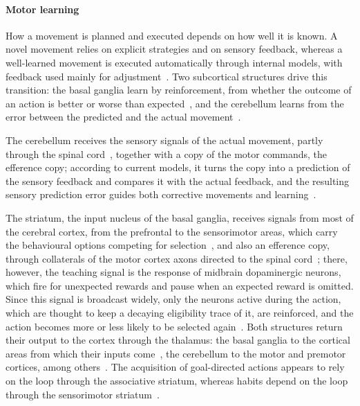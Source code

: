 \documentclass[12pt]{report}
\begin{document}
\paragraph{Motor learning}
How a movement is planned and executed depends on how well it is known. A novel movement relies on explicit strategies and on sensory feedback, whereas a well-learned movement is executed automatically through internal models, with feedback used mainly for adjustment~\cite[pp.~729--732]{wolpert2021}. Two subcortical structures drive this transition: the basal ganglia learn by reinforcement, from whether the outcome of an action is better or worse than expected~\cite[pp.~943--946]{redgrave2021}, and the cerebellum learns from the error between the predicted and the actual movement~\cite[pp.~923--925]{bastian2021}.

The cerebellum receives the sensory signals of the actual movement, partly through the spinal cord~\cite[pp.~916, 918]{bastian2021}, together with a copy of the motor commands, the efference copy; according to current models, it turns the copy into a prediction of the sensory feedback and compares it with the actual feedback, and the resulting sensory prediction error guides both corrective movements and learning~\cite[p.~923]{bastian2021}.

The striatum, the input nucleus of the basal ganglia, receives signals from most of the cerebral cortex, from the prefrontal to the sensorimotor areas, which carry the behavioural options competing for selection~\cite[pp.~934, 938--939]{redgrave2021}, and also an efference copy, through collaterals of the motor cortex axons directed to the spinal cord~\cite[p.~939]{redgrave2021}; there, however, the teaching signal is the response of midbrain dopaminergic neurons, which fire for unexpected rewards and pause when an expected reward is omitted. Since this signal is broadcast widely, only the neurons active during the action, which are thought to keep a decaying eligibility trace of it, are reinforced, and the action becomes more or less likely to be selected again~\cite[pp.~944--945]{redgrave2021}. Both structures return their output to the cortex through the thalamus: the basal ganglia to the cortical areas from which their inputs come~\cite[p.~937]{redgrave2021}, the cerebellum to the motor and premotor cortices, among others~\cite[pp.~911, 915]{bastian2021}. The acquisition of goal-directed actions appears to rely on the loop through the associative striatum, whereas habits depend on the loop through the sensorimotor striatum~\cite[p.~946]{redgrave2021}.
\end{document}
